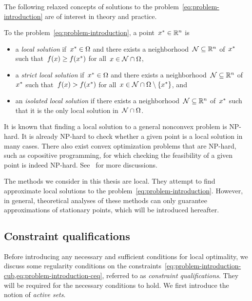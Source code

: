 The following relaxed concepts of solutions to the problem~\cref{eq:problem-introduction} are of interest in theory and practice.

\begin{definition}
    To the problem~\cref{eq:problem-introduction}, a point~$\iter[\ast] \in \R^n$ is
    \begin{itemize}
        \item a \emph{local solution} if~$\iter[\ast] \in \fset$ and there exists a neighborhood~$\mathcal{N} \subseteq \mathbb{R}^n$ of~$\iter[\ast]$ such that~$\obj(\iter) \ge \obj(\iter[\ast])$ for all~$\iter \in \mathcal{N} \cap \fset$,
        \item a \emph{strict local solution} if~$\iter[\ast] \in \fset$ and there exists a neighborhood~$\mathcal{N} \subseteq \mathbb{R}^n$ of~$\iter[\ast]$ such that~$\obj(\iter) > \obj(\iter[\ast])$ for all~$\iter \in \mathcal{N} \cap \fset \setminus \set{\iter[\ast]}$, and
        \item an \emph{isolated local solution} if there exists a neighborhood~$\mathcal{N} \subseteq \mathbb{R}^n$ of~$\iter[\ast]$ such that it is the only local solution in~$\mathcal{N} \cap \Omega$.
    \end{itemize}
\end{definition}

It is known that finding a local solution to a general nonconvex problem is NP-hard.
It is already NP-hard to check whether a given point is a local solution in many cases.
There also exist convex optimization problems that are NP-hard, such as copositive programming, for which checking the feasibility of a given point is indeed NP-hard.
See~\cite{Murty_Kabadi_1987} for more discussions.

The methods we consider in this thesis are local.
They attempt to find approximate local solutions to the problem~\cref{eq:problem-introduction}.
However, in general, theoretical analyses of these methods can only guarantee approximations of stationary points, which will be introduced hereafter.

\subsection{Constraint qualifications}

Before introducing any necessary and sufficient conditions for local optimality, we discuss some regularity conditions on the constraints~\cref{eq:problem-introduction-cub,eq:problem-introduction-ceq}, referred to as \emph{constraint qualifications}.
They will be required for the necessary conditions to hold.
We first introduce the notion of \emph{active sets}.

